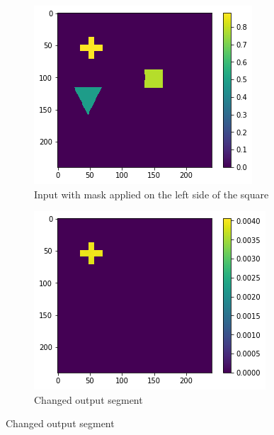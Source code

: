\begin{figure}[H]
    \centering
    \begin{subfigure}[t]{.33\textwidth}
        \centering
        \includegraphics[width=\linewidth]{chapters/06_hdm/images_analyze/1a_masked.png}
        \caption{Input with mask applied on the left side of the square}
    \end{subfigure}%
    \begin{subfigure}[t]{.33\textwidth}
        \centering
        \includegraphics[width=\linewidth]{chapters/06_hdm/images_analyze/1b_segment.png}
        \caption{Changed output segment}
    \end{subfigure}

\end{figure}
